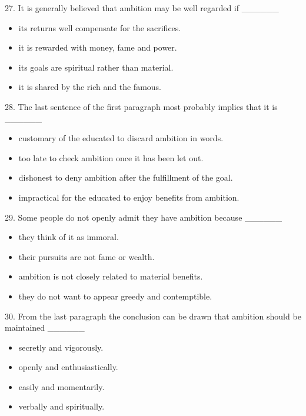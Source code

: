 \documentclass[UTF8,11pt]{ctexart}
\begin{document}
27. It is generally believed that ambition may be well regarded if \_\_\_\_\_\_


\begin{itemize}[leftmargin=2em,itemsep=.2em,topsep=.4em]\item[A.] its returns well compensate for the sacrifices.
\item[B.] it is rewarded with money, fame and power.
\item[C.] its goals are spiritual rather than material.
\item[D.] it is shared by the rich and the famous.
\end{itemize}

28. The last sentence of the first paragraph most probably implies that it is \_\_\_\_\_\_


\begin{itemize}[leftmargin=2em,itemsep=.2em,topsep=.4em]\item[A.] customary of the educated to discard ambition in words.
\item[B.] too late to check ambition once it has been let out.
\item[C.] dishonest to deny ambition after the fulfillment of the goal.
\item[D.] impractical for the educated to enjoy benefits from ambition.
\end{itemize}

29. Some people do not openly admit they have ambition because \_\_\_\_\_\_


\begin{itemize}[leftmargin=2em,itemsep=.2em,topsep=.4em]\item[A.] they think of it as immoral.
\item[B.] their pursuits are not fame or wealth.
\item[C.] ambition is not closely related to material benefits.
\item[D.] they do not want to appear greedy and contemptible.
\end{itemize}

30. From the last paragraph the conclusion can be drawn that ambition should be maintained \_\_\_\_\_\_


\begin{itemize}[leftmargin=2em,itemsep=.2em,topsep=.4em]\item[A.] secretly and vigorously.
\item[B.] openly and enthusiastically.
\item[C.] easily and momentarily.
\item[D.] verbally and spiritually.
\end{itemize}
\end{document}
